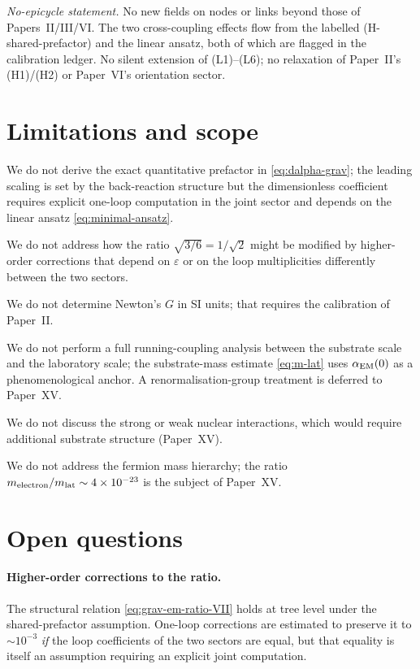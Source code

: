 \documentclass[11pt,a4paper]{article}
\begin{document}
\noindent\emph{No-epicycle statement.} No new fields on nodes or links beyond those of Papers~II/III/VI. The two cross-coupling effects flow from the labelled (H-shared-prefactor) and the linear ansatz, both of which are flagged in the calibration ledger. No silent extension of (L1)--(L6); no relaxation of Paper~II's (H1)/(H2) or Paper~VI's orientation sector.
\section{Limitations and scope}
\label{sec:not}

We do not derive the exact quantitative prefactor in
\eqref{eq:dalpha-grav}; the leading scaling is set by the
back-reaction structure but the dimensionless coefficient
requires explicit one-loop computation in the joint sector and
depends on the linear ansatz \eqref{eq:minimal-ansatz}.

We do not address how the ratio $\sqrt{3/6} = 1/\sqrt{2}$ might
be modified by higher-order corrections that depend on
$\varepsilon$ or on the loop multiplicities differently between
the two sectors.

We do not determine Newton's $G$ in SI units; that requires the
calibration of Paper~II.

We do not perform a full running-coupling analysis between the
substrate scale and the laboratory scale; the substrate-mass
estimate \eqref{eq:m-lat} uses $\alpha_{\rm EM}(0)$ as a
phenomenological anchor. A renormalisation-group treatment is
deferred to Paper~XV.

We do not discuss the strong or weak nuclear interactions,
which would require additional substrate structure (Paper~XV).

We do not address the fermion mass hierarchy; the ratio
$m_{\rm electron}/m_{\rm lat} \sim 4 \times 10^{-23}$ is the
subject of Paper~XV.

\section{Open questions}
\label{sec:open}

\paragraph{Higher-order corrections to the ratio.}
The structural relation \eqref{eq:grav-em-ratio-VII} holds at
tree level under the shared-prefactor assumption. One-loop
corrections are estimated to preserve it to $\sim 10^{-3}$
\emph{if} the loop coefficients of the two sectors are equal, but
that equality is itself an assumption requiring an explicit
joint computation.
\end{document}
